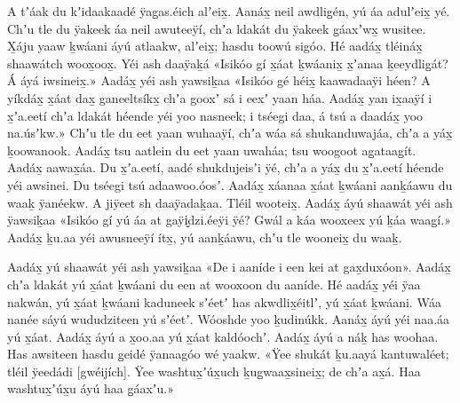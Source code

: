 \begin{pairs}
\begin{Leftside}
\pstart
{}A tʼáak du kʼidaakaadé ÿag̱as.éich alʼeix̱.
Aanáx̱ neil awdlig̱én,\hspace{-0.125ex} yú áa adulʼeix̱ yé.\hspace{-0.4375ex}
\hspace*{-0.125ex}Chʼu tle du ÿakeek áa neil awuteeÿí, chʼa ldakát du ÿakeek g̱áaxʼwx̱ wusitee.
X̱áju yaaw ḵwáa\-ni áyú atlaakw, alʼeix̱;
hasdu toowú sigóo.
Hé aadáx̱ tléináx̱ shaawátch woox̱oox̱.
Yéi ash daaÿaḵá
«\!Isikóo gí x̱áat ḵwáanix̱ x̱ʼanaa ḵeeydlig̱át?
Á áyá iwsineix̱.\!»
Aadáx̱ yéi ash yawsiḵaa
«\!Isikóo gé héix̱ kaawadaaÿi héen?
A yíkdáx̱ x̱áat dax̱ ganeeltsíkx̱ chʼa gooxʼ sá i eexʼ yaan háa.
Aadáx̱ yan ix̱aaÿí i x̱ʼa.eetí chʼa ldakát héende yéi yoo nasneek;
i tséegi daa, á tsú a daadáx̱ yoo na.úsʼkw.\!»
Chʼu tle du eet yaan wuhaaÿí,
chʼa wáa sá shukanduwajáa,
chʼa a yáx̱ ḵoowanook.
Aadáx̱ tsu aatlein du eet yaan uwaháa; tsu woogoot ag̱ataag̱ít.
Aadáx̱ aawax̱áa.
Du x̱ʼa.eetí, aadé shukdujeisʼi ÿé, chʼa a yáx̱ du x̱ʼa.eetí héende yéi awsinei.
Du tséegi tsú adaawoo.óosʼ.
Aadáx̱ xáanaa x̱áat ḵwáani aanḵáawu du waaḵ ÿanéekw.
A jiÿeet sh daaÿadaḵaa.
Tléil wooteix̱.
Aadáx̱ áyú shaawát yéi ash ÿawsiḵaa
«\!Isikóo gí yú áa at gaÿi̬dzi.éeÿi ÿé?
Gwál a káa wooxeex yú ḵáa waag̱í.\!»
Aadáx̱ ḵu.aa yéi awusneeÿí ítx̱, yú aanḵáawu, chʼu tle wooneix̱ du waaḵ.
\pend

\pstart
{}Aadáx̱ yú shaawát yéi ash yawsiḵaa
«\!De i aaníde i een kei at gax̱duxóon\!».
Aadáx̱ chʼa ldakát yú x̱áat ḵwáani du een at wooxoon du aaníde.
Hé aadáx̱ yéi ÿaa nakwán, yú x̱áat ḵwáani kaduneek sʼéetʼ has akwdlix̱éitlʼ, yú x̱áat ḵwáani.
\qqk{}Wáa nanée sáyú wududziteen yú sʼéetʼ.
Wóoshde yoo ḵudinúkk.
Aa\-náx̱ áyú yéi naa.áa yú x̱áat.
Aadáx̱ áyú a x̱oo.aa yú x̱áat kaldóochʼ.
Aadáx̱ áyú a náḵ has woohaa.
Has awsiteen hasdu g̱eidé ÿanaagóo wé yaakw.
«Ÿee shukát ḵu.aayá kantuwaléet; tléil ÿeedádi [gwéijích].
Ÿee washtux̱ʼúx̱uch ḵug̱waax̱sineix̱; de chʼa ax̱á.
Haa washtux̱ʼúx̱u áyú haa g̱áaxʼu.\!»
\pend


\end{Leftside}
\end{pairs}
